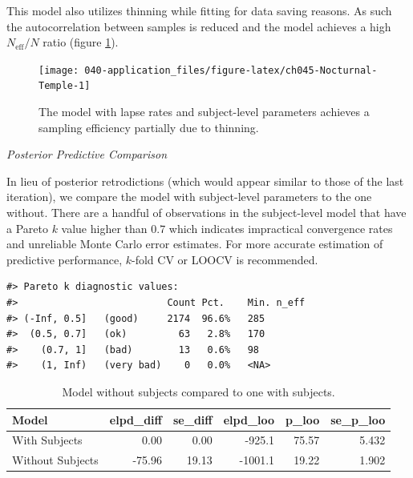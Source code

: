 \documentclass[11pt, oneside, openany]{scrbook}
\begin{document}
This model also utilizes thinning while fitting for data saving reasons. As such the autocorrelation between samples is reduced and the model achieves a high \(N_{\mathrm{eff}}/N\) ratio (figure \ref{fig:ch045-Nocturnal-Temple}).

\begin{figure}

{\centering \texttt{[image: 040-application\_files/figure-latex/ch045-Nocturnal-Temple-1]} 

}

\caption{The model with lapse rates and subject-level parameters achieves a sampling efficiency partially due to thinning.}\label{fig:ch045-Nocturnal-Temple}
\end{figure}

\emph{Posterior Predictive Comparison}

In lieu of posterior retrodictions (which would appear similar to those of the last iteration), we compare the model with subject-level parameters to the one without. There are a handful of observations in the subject-level model that have a Pareto \(k\) value higher than \(0.7\) which indicates impractical convergence rates and unreliable Monte Carlo error estimates. For more accurate estimation of predictive performance, \(k\)-fold CV or LOOCV is recommended.


\begin{verbatim}
#> Pareto k diagnostic values:
#>                          Count Pct.    Min. n_eff
#> (-Inf, 0.5]   (good)     2174  96.6%   285       
#>  (0.5, 0.7]   (ok)         63   2.8%   170       
#>    (0.7, 1]   (bad)        13   0.6%   98        
#>    (1, Inf)   (very bad)    0   0.0%   <NA>
\end{verbatim}


\begin{table}[!h]

\caption{\label{tab:ch045-Deserted-Fish}Model without subjects compared to one with subjects.}
\centering
\begin{tabular}[t]{lrrrrr}
\toprule
Model & elpd\_diff & se\_diff & elpd\_loo & p\_loo & se\_p\_loo\\
\midrule
With Subjects & 0.00 & 0.00 & -925.1 & 75.57 & 5.432\\
Without Subjects & -75.96 & 19.13 & -1001.1 & 19.22 & 1.902\\
\bottomrule
\end{tabular}
\end{table}
\end{document}
